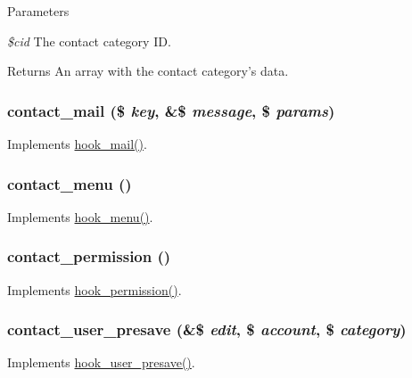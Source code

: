 \begin{DoxyParams}{Parameters}
\item[{\em \$cid}]The contact category ID.\end{DoxyParams}
\begin{DoxyReturn}{Returns}
An array with the contact category's data. 
\end{DoxyReturn}
\hypertarget{contact_8module_a1d55f88a983d634aa400860e2917f24a}{
\subsubsection[{contact\_\-mail}]{\setlength{\rightskip}{0pt plus 5cm}contact\_\-mail (\$ {\em key}, \/  \&\$ {\em message}, \/  \$ {\em params})}}
\label{contact_8module_a1d55f88a983d634aa400860e2917f24a}
Implements \hyperlink{group__hooks_gacdeb1cba0d0a86ac4de3fff7d4765777}{hook\_\-mail()}. \hypertarget{contact_8module_aa553b7cf1c3901cce1c2a8c4a04c5212}{
\subsubsection[{contact\_\-menu}]{\setlength{\rightskip}{0pt plus 5cm}contact\_\-menu ()}}
\label{contact_8module_aa553b7cf1c3901cce1c2a8c4a04c5212}
Implements \hyperlink{group__hooks_ga5c95244fea59b25666e409759e133ded}{hook\_\-menu()}. \hypertarget{contact_8module_a3c4458c442dae246cadee924683670fb}{
\subsubsection[{contact\_\-permission}]{\setlength{\rightskip}{0pt plus 5cm}contact\_\-permission ()}}
\label{contact_8module_a3c4458c442dae246cadee924683670fb}
Implements \hyperlink{group__hooks_ga2b22b45f4925f2478412477bae329713}{hook\_\-permission()}. \hypertarget{contact_8module_aacb579e6af028d48e3becd45574b09f1}{
\subsubsection[{contact\_\-user\_\-presave}]{\setlength{\rightskip}{0pt plus 5cm}contact\_\-user\_\-presave (\&\$ {\em edit}, \/  \$ {\em account}, \/  \$ {\em category})}}
\label{contact_8module_aacb579e6af028d48e3becd45574b09f1}
Implements \hyperlink{group__hooks_gab6b224c35d7d97259d4350a7849f1e56}{hook\_\-user\_\-presave()}. 